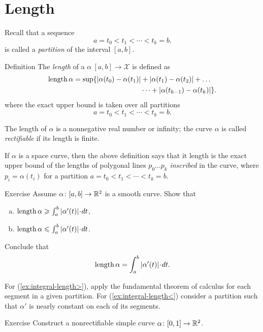 \chapter{Length}
 
Recall that a sequence 
\[a=t_0 < t_1 < \cdots < t_k=b.\]
is called a \emph{partition} of the interval $[a,b]$.

\begin{thm}{Definition}\label{def:length}
The \emph{length} of a $\alpha\:[a,b]\to \mathcal{X}$ is defined as
\begin{align*}
\mathop{\rm length}\nolimits \alpha
= 
\sup \{|\alpha(t_0)-\alpha(t_1)|&+|\alpha(t_1)-\alpha(t_2)|+\dots
\\
&\dots+|\alpha(t_{k-1})-\alpha(t_k)|\}. 
\end{align*}
where the exact upper bound is taken over all partitions
\[a=t_0 < t_1 < \cdots < t_k=b.\]

The length of $\alpha$ is a nonnegative real number or infinity;
the curve $\alpha$ is called \emph{rectifiable} if its length is finite. %
\end{thm}

If $\alpha$ is a space curve, then the above definition says that it length is the exact upper bound of the lengths of polygonal lines $p_0\dots p_k$ \emph{inscribed} in the curve, where $p_i=\alpha(t_i)$ for a  partition $a=t_0 < t_1 < \cdots < t_k=b$.

\begin{thm}{Exercise}\label{ex:integral-length}
Assume $\alpha\colon[a,b]\to\mathbb{R}^2$ is a smooth curve.
Show that
\begin{enumerate}[(a)]
\item\label{ex:integral-length>} $\length \alpha\ge \int_a^b|\alpha'(t)|\cdot dt$,
\item\label{ex:integral-length<} $\length \alpha\le \int_a^b|\alpha'(t)|\cdot dt$.
\end{enumerate}
Conclude that 
\[\length \alpha= \int_a^b|\alpha'(t)|\cdot dt.\]
\end{thm}

 For (\ref{ex:integral-length>}), apply the fundamental theorem of calculus for each segment in a given partition. For (\ref{ex:integral-length<}) consider a partition such that $\alpha'$ is nearly constant on each of its segments.

\begin{thm}{Exercise}\label{ex:nonrectifiable-curve}
Construct a nonrectifiable simple curve $\alpha\:[0,1]\z\to\RR^2$.
\end{thm}

